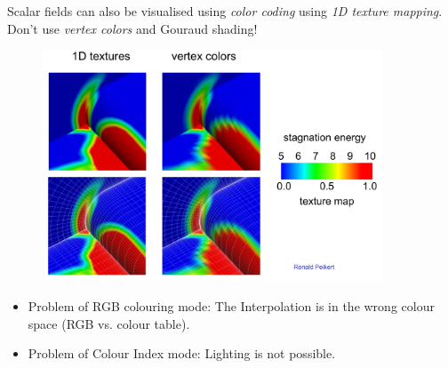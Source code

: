Scalar fields can also be visualised using \emph{color coding} using \emph{1D texture mapping}. Don't use \emph{vertex colors} and Gouraud shading!
\begin{figure}[H]
    \centering
    \includegraphics[width=0.9\textwidth]{img/01_texture_mapping}
\end{figure}

\begin{itemize}
    \item Problem of RGB colouring mode: The Interpolation is in the wrong colour space (RGB vs. colour table).
    \item  Problem of Colour Index mode: Lighting is not possible. 
\end{itemize}


